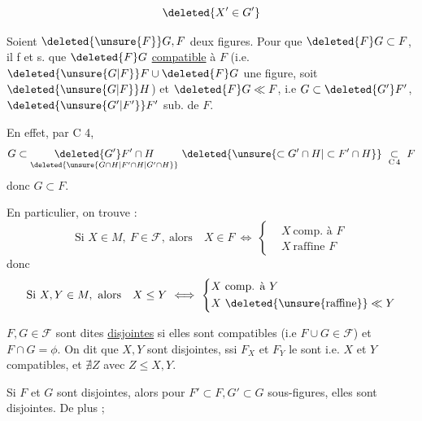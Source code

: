 \[
\deleted{X'\in G'}
\]


 Soient $\deleted{\unsure{F}}G,F$ deux figures. Pour que $\deleted{F}G\subset F$, il f et s. que $\deleted{F}G$ \uline{compatible} à $F$ (i.e. $\deleted{\unsure{G|F}}F\cup\deleted{F}G$ une figure, soit $\deleted{\unsure{G|F}}H$) et $\deleted{F}G\ll F$, i.e $G\subset\deleted{G'}F'$, $\deleted{\unsure{G'|F'}}F'$ sub. de $F$.

En effet, par  C 4, 
\[
G\subset \underset{\deleted{\unsure{G\cap H|F'\cap H|G'\cap H}}}{\deleted{G'}F'\cap H}\ \deleted{\unsure{\subset G'\cap H|\subset F'\cap H}}\ \underset{\mathrm C\,4}{\subset}\ F
\]
donc $G\subset F$.

En particulier, on trouve :
\[
\text{Si } X\in M,\ F\in\mathcal F,\ \text{alors}\quad X\in F\ \Longleftrightarrow\
\left\{\begin{aligned}
&X\ \text{comp. à }F\\
&X\ \text{raffine }F
\end{aligned}\right.
\]
donc
\[
\text{Si } X,Y\in M,\ \text{alors}\quad X\leq Y\ \Longleftrightarrow\
\left\{\begin{aligned}
&X\ \text{comp. à }Y\\
&X\ \deleted{\text{\unsure{raffine}}}\ll Y
\end{aligned}\right.
\]


\deleted{\uline{\unsure{C 5|C 8|C 2}}} $F,G\in\mathcal F$ sont dites \uline{disjointes} si elles sont compatibles (i.e $F\cup G\in\mathcal F$) et $F\cap G=\phi$. On dit que $X,Y$ sont disjointes, ssi $F_X$ et $F_Y$ le sont i.e. $X$ et $Y$ compatibles, et $\nexists Z$ avec $Z\leq X,Y$.

Si $F$ et $G$ sont disjointes, alors pour $F'\subset F,G'\subset G$ sous-figures, elles sont disjointes. De plus ;

